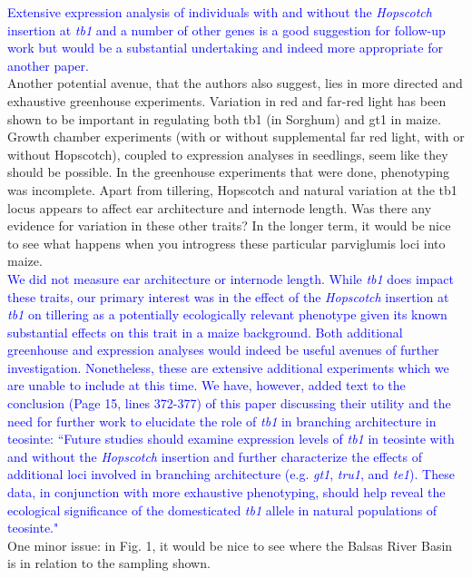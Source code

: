 \documentclass[11pt]{article}
\newcommand{\res}[1]{\noindent \textcolor{blue}{{#1}} \\}
\begin{document}
\res{Extensive expression analysis of individuals with and without the \emph{Hopscotch} insertion at \emph{tb1} and a number of other genes is a good suggestion for follow-up work but would be a substantial undertaking and indeed more appropriate for another paper. }

Another potential avenue, that the authors also suggest, lies in more directed and exhaustive greenhouse experiments. Variation in red and far-red light has been shown to be important in regulating both tb1 (in Sorghum) and gt1 in maize. Growth chamber experiments (with or without supplemental far red light, with or without Hopscotch), coupled to expression analyses in seedlings, seem like they should be possible.  In the greenhouse experiments that were done, phenotyping was incomplete. Apart from tillering, Hopscotch and natural variation at the tb1 locus appears to affect ear architecture and internode length. Was there any evidence for variation in these other traits? In the longer term, it would be nice to see what happens when you introgress these particular parviglumis loci into maize.\\ 

\res{We did not measure ear architecture or internode length. 
While \emph{tb1} does impact these traits, our primary interest was in the effect of the \emph{Hopscotch} insertion at \emph{tb1} on tillering as a potentially ecologically relevant phenotype given its known substantial effects on this trait in a maize background.
Both additional greenhouse and expression analyses would indeed be useful avenues of further investigation.
Nonetheless, these are extensive additional experiments which we are unable to include at this time. 
We have, however, added text to the conclusion (Page 15, lines 372-377) of this paper discussing their utility and the need for further work to elucidate the role of \emph{tb1} in branching architecture in teosinte:
``Future studies should examine expression levels of \emph{tb1} in teosinte with and without the \emph{Hopscotch} insertion and further characterize the effects of additional loci involved in branching architecture (e.g. \emph{gt1}, \emph{tru1}, and \emph{te1}).  These data, in conjunction with more exhaustive phenotyping, should help reveal the ecological significance of the domesticated \emph{tb1} allele in natural populations of teosinte."}

One minor issue: in Fig. 1, it would be nice to see where the Balsas River Basin is in relation to the sampling shown. 
\end{document}
